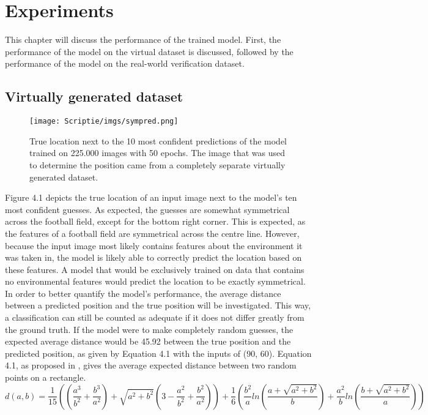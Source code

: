 \documentclass{uva-inf-bachelor-thesis}
\begin{document}
\chapter{Experiments}
    This chapter will discuss the performance of the trained model. First, the performance of the model on the virtual dataset is discussed, followed by the performance of the model on the real-world verification dataset.
    \section{Virtually generated dataset}
        \begin{figure}[H]
        \centering
        \texttt{[image: Scriptie/imgs/sympred.png]}
        \caption{True location next to the 10 most confident predictions of the model trained on 225.000 images with 50 epochs. The image that was used to determine the position came from a completely separate virtually generated dataset.}
        \end{figure}

    Figure 4.1 depicts the true location of an input image next to the model's ten most confident guesses. As expected, the guesses are somewhat symmetrical across the football field, except for the bottom right corner. This is expected, as the features of a football field are symmetrical across the centre line. However, because the input image most likely contains features about the environment it was taken in, the model is likely able to correctly predict the location based on these features. A model that would be exclusively trained on data that contains no environmental features would predict the location to be exactly symmetrical. 
    \hfill \break \\
    In order to better quantify the model's performance, the average distance between a predicted position and the true position will be investigated. This way, a classification can still be counted as adequate if it does not differ greatly from the ground truth. If the model were to make completely random guesses, the expected average distance would be 45.92 between the true position and the predicted position, as given by Equation 4.1 with the inputs of (90, 60). Equation 4.1, as proposed in \cite{avgdistance}, gives the average expected distance between two random points on a rectangle. 
    \begin{equation}
    d(a, b) = \frac{1}{15} \left(\left( \frac{a^3}{b^2} + \frac{b^3}{a^2}\right) + \sqrt{a^2 + b^2} \left(3 - \frac{a^2}{b^2} + \frac{b^2}{a^2}\right)\right) + \frac{1}{6}\left(\frac{b^2}{a} ln\left(\frac{a + \sqrt{a^2 + b^2}}{b}\right) + \frac{a^2}{b}ln\left(\frac{b + \sqrt{a^2 + b^2}}{a}\right)\right)
    \end{equation}
\end{document}

